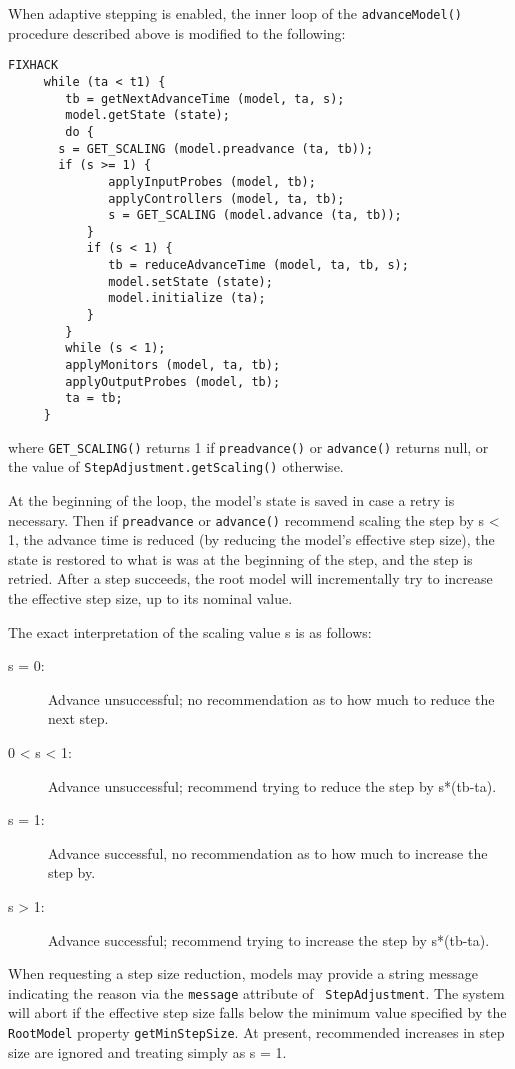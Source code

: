 \documentclass{article}
\begin{document}
When adaptive stepping is enabled, the inner loop of the
{\tt advanceModel()} procedure described above is modified to the following:
\begin{lstlisting}FIXHACK
     while (ta < t1) {
        tb = getNextAdvanceTime (model, ta, s);
        model.getState (state);
        do {
	   s = GET_SCALING (model.preadvance (ta, tb));
	   if (s >= 1) {
              applyInputProbes (model, tb);
              applyControllers (model, ta, tb);
              s = GET_SCALING (model.advance (ta, tb));
           }
           if (s < 1) {
              tb = reduceAdvanceTime (model, ta, tb, s);
              model.setState (state);
              model.initialize (ta);
           }
        }
        while (s < 1);
        applyMonitors (model, ta, tb);
        applyOutputProbes (model, tb);
        ta = tb;
     }
\end{lstlisting}
where {\tt GET\_SCALING()} returns 1 if {\tt preadvance()} or
{\tt advance()} returns null, or the value of 
{\tt StepAdjustment.getScaling()} otherwise.

At the beginning of the loop, the model's state is saved in case a
retry is necessary. Then if {\tt preadvance{}} or {\tt advance()} recommend
scaling the step by s < 1, the advance time is
reduced (by reducing the model's effective step size), the state is
restored to what is was at the beginning of the step, and the step is
retried. After a step succeeds, the root model will
incrementally try to increase the effective step size, up to its
nominal value.

The exact interpretation of the scaling value s is
as follows:

\begin{description}
\item[s = 0:]
Advance unsuccessful; no recommendation as to how much to reduce the 
next step.

\item[0 < s < 1:]
Advance unsuccessful; recommend trying to reduce the step by s*(tb-ta).

\item[s = 1:]
Advance successful, no recommendation as to how much to increase the step by.

\item[s > 1:]
Advance successful; recommend trying to increase the step by s*(tb-ta).
\end{description}

When requesting a step size reduction, models may provide a string
message indicating the reason via the {\tt message} attribute of {\tt
StepAdjustment}.  The system will abort if the effective step size
falls below the minimum value specified by the {\tt RootModel}
property {\tt getMinStepSize}. At present, recommended increases in
step size are ignored and treating simply as s = 1.
\end{document}
